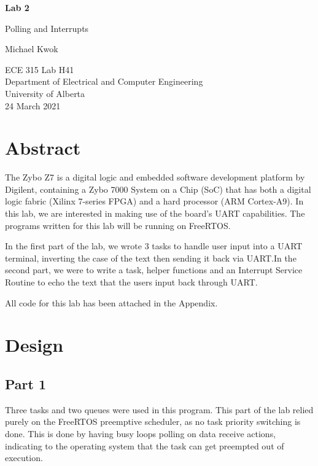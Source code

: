 \documentclass{article}
\begin{document}
\begin{titlepage}
    \begin{center}
        \vspace*{1cm}

        \textbf{\Large{Lab 2}}

        \vspace{0.5cm}

        \LARGE{Polling and Interrupts}
        \vspace{1.5cm}

        Michael Kwok

        \vfill
        \Large{ECE 315 Lab H41\\
            Department of Electrical and Computer Engineering\\
            University of Alberta\\
            24 March 2021}
    \end{center}
\end{titlepage}
\newpage
\tableofcontents
\thispagestyle{empty}
\newpage
\section{Abstract}
The Zybo Z7 is a digital logic and embedded software development platform by Digilent, containing a Zybo 7000 System on a Chip (SoC) that has both a digital logic fabric (Xilinx 7-series FPGA) and a hard processor (ARM Cortex-A9). In this lab, we are interested in making use of the board's UART capabilities. The programs written for this lab will be running on FreeRTOS.\@

In the first part of the lab, we wrote 3 tasks to handle user input into a UART terminal, inverting the case of the text then sending it back via UART.\@ In the second part, we were to write a task, helper functions and an Interrupt Service Routine to echo the text that the users input back through UART.\@

All code for this lab has been attached in the Appendix.

\section{Design}
\subsection{Part 1}
Three tasks and two queues were used in this program. This part of the lab relied purely on the FreeRTOS preemptive scheduler, as no task priority switching is done. This is done by having busy loops polling on data receive actions, indicating to the operating system that the task can get preempted out of execution.\@
\end{document}
